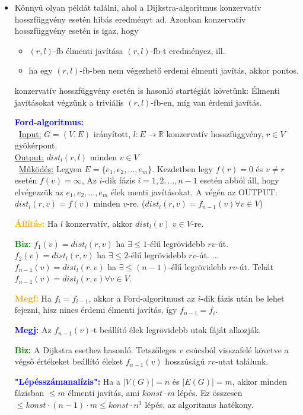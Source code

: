 \documentclass[../../szobeli.tex]{subfiles}
\begin{document}
\begin{itemize}
        \item Könnyű olyan példát találni, ahol a Dijkstra-algoritmus konzervatív hosszfüggvény esetén hibás eredményt ad. Azonban konzervatív hosszfüggvény esetén is igaz, hogy 

            \begin{itemize}
                \item $(r,l)$-fb élmenti javítása $(r,l)$-fb-t eredményez, ill. 
                \item ha egy $(r,l)$-fb-ben nem végezhető erdemi élmenti javítás, akkor pontos.
            \end{itemize}

            konzervatív hosszfüggvény esetén is hasonló startégiát követünk: Élmenti javításokat végzünk a triviális $(r,l)$-fb-en, míg van érdemi javítás.

            \textcolor{blue}{\textbf{Ford-algoritmus:}} \\ \underline{Input:} $G = (V,E)$ irányított, $l:E \rightarrow \mathbb{R}$ konzervatív hosszfüggvény, $r \in V$ gyökérpont. \\ \underline{Output:} $dist_l(r,l)$ minden $ v \in V$ \\ \underline{Működés:} Legyen $E = \{e_1, e_2,\dots, e_m\}$. Kezdetben legy $f(r)=0$ és $v\neq r$ esetén $f(v)=\infty$, Az $i$-dik fázis $i=1 ,2 ,\dots, n-1$ esetén abból áll, hogy elvégezzük az $e_1, e_2,\dots, e_m$ élek menti javításokat. A végén az OUTPUT: $dist_l(r,v) = f(v)$ minden $v$-re. ($dist_l(r,v) = f_{n-1}(v)\forall v\in V$)

            \textcolor{orange}{\textbf{Állítás:}} Ha $l$ konzervatív, akkor $dist_l(v)\; v \in V$-re.

            \textcolor{green}{\textbf{Biz:}} $f_1(v) = dist_l(r,v)$ ha $\exists \leq 1$-élű legrövidebb $rv$-út. $f_2(v) = dist_l(r,v)$ ha $\exists \leq 2$-élű legrövidebb $rv$-út. $\dots$ $f_{n-1}(v) = dist_l(r,v)$ ha $\exists \leq (n-1)$-élű legrövidebb $rv$-út. Tehát $f_{n-1}(v) = dist_l(r,v) \forall v \in V$.   

            \textcolor{orange}{\textbf{Megf:}} Ha $f_i = f_{i-1}$, akkor a Ford-algoritmust az $i$-dik fázis után be lehet fejezni, hisz nincs érdemi élmenti javítás, így $f_{n-1} = f_i$.

            \textcolor{blue}{\textbf{Megj:}} Az $f_{n-1}(v)$-t beállító élek legrövidebb utak fáját alkozják. 

            \textcolor{green}{\textbf{Biz:}} A Dijkstra esethez hasonló. Tetszőleges $v$ csúcsból visszafelé követve a végső értékeket beállító éleket $f_{n-1}(v)$ hosszúságú $rv$-utat találunk.   

            \textcolor{blue}{\textbf{"Lépésszámanalízis":}} Ha a $|V(G)| = n$ és $|E(G)| = m$, akkor minden fázisban $\leq m$ élmenti javítás, ami $konst \cdot m$ lépés. Ez összesen $\leq konst \cdot (n-1) \cdot m \leq konst \cdot n^3$ lépés, az algoritmus hatékony.

    \end{itemize}
\end{document}
